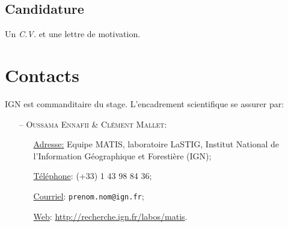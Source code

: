 \documentclass[a4paper,11pt]{article}
\begin{document}
    \subsection*{Candidature}
    Un \textit{C.V.} et une lettre de motivation.

    \section*{Contacts}
    IGN est commanditaire du stage. L'encadrement scientifique se assurer par:
    \begin{itemize}
        \item[--] \textsc{Oussama Ennafii \& Clément Mallet:}
        \begin{itemize}
            \item[\underline{Adresse:}] Equipe MATIS, laboratoire LaSTIG, Institut National de l'Information Géographique et Forestière (IGN);
            \item[\underline{Téléphone}:] (+33) 1 43 98 84 36;
            \item[\underline{Courriel}:] \texttt{prenom.nom@ign.fr};
            \item[\underline{Web}:] \url{http://recherche.ign.fr/labos/matis}.
        \end{itemize}
    \end{itemize}
\end{document}
